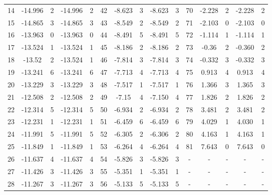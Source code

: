 \begin{table}[h]
\begin{tabular}{c|cc|cc||c|cc|cc||c|cc|cc}
 14  & -14.996 &       2 & -14.996 & 2 & 42  &  -8.623 &       3 & -8.623 & 3 & 70  &  -2.228 &       2 & -2.228 & 2 \\
 15  & -14.865 &       3 & -14.865 & 3 & 43  &  -8.549 &       2 & -8.549 & 2 & 71  &  -2.103 &       0 & -2.103 & 0 \\
 16  & -13.963 &       0 & -13.963 & 0 & 44  &  -8.491 &       5 & -8.491 & 5 & 72  &  -1.114 &       1 & -1.114 & 1 \\
 17  & -13.524 &       1 & -13.524 & 1 & 45  &  -8.186 &       2 & -8.186 & 2 & 73  &   -0.36 &       2 & -0.360 & 2 \\
 18  &  -13.52 &       2 & -13.524 & 1 & 46  &  -7.814 &       3 & -7.814 & 3 & 74  &  -0.332 &       3 & -0.332 & 3 \\
 19  & -13.241 &       6 & -13.241 & 6 & 47  &  -7.713 &       4 & -7.713 & 4 & 75  &   0.913 &       4 & 0.913 & 4 \\
 20  & -13.229 &       3 & -13.229 & 3 & 48  &  -7.517 &       1 & -7.517 & 1 & 76  &   1.366 &       3 & 1.365 & 3 \\
 21  & -12.508 &       2 & -12.508 & 2 & 49  &   -7.15 &       4 & -7.150 & 4 & 77  &   1.826 &       2 & 1.826 & 2 \\
 22  & -12.314 &       5 & -12.314 & 5 & 50  &  -6.934 &       2 & -6.934 & 2 & 78  &   3.481 &       2 & 3.481 & 2 \\
 23  & -12.231 &       1 & -12.231 & 1 & 51  &  -6.459 &       6 & -6.459 & 6 & 79  &   4.029 &       1 & 4.030 & 1 \\
 24  & -11.991 &       5 & -11.991 & 5 & 52  &  -6.305 &       2 & -6.306 & 2 & 80  &   4.163 &       1 & 4.163 & 1 \\
 25  & -11.849 &       1 & -11.849 & 1 & 53  &  -6.264 &       4 & -6.264 & 4 & 81  &   7.643 &       0 & 7.643 & 0 \\
 26  & -11.637 &       4 & -11.637 & 4 & 54  &  -5.826 &       3 & -5.826 & 3 &  -  &  -  &  -  &  -  &  -  \\
 27  & -11.426 &       3 & -11.426 & 3 & 55  &  -5.351 &       1 & -5.351 & 1 &  -  &  -  &  -  &  -  &  -  \\
 28  & -11.267 &       3 & -11.267 & 3 & 56  &  -5.133 &       5 & -5.133 & 5 &  -  &  -  &  -  &  -  &  -  \\
\hline
\end{tabular}
\end{table}


